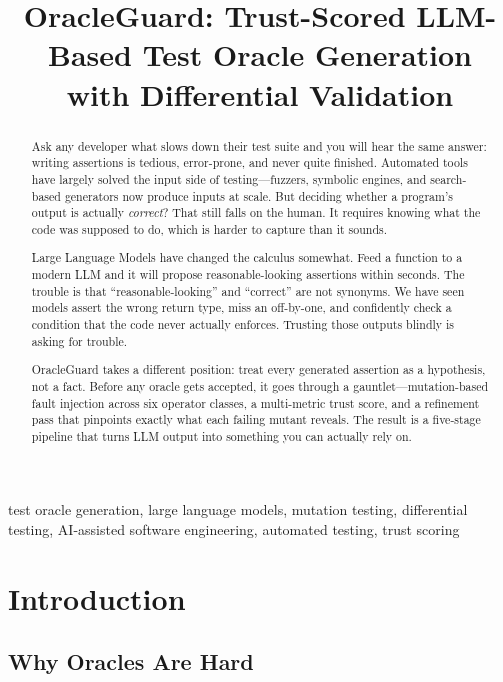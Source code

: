 \documentclass[conference]{IEEEtran}
\title{OracleGuard: Trust-Scored LLM-Based Test Oracle Generation\\with Differential Validation}
\author{
  \IEEEauthorblockN{Anonymous Author(s)}
  \IEEEauthorblockA{Anonymous Institution\\
  Anonymous City, Country\\
  anonymous@email.com}
}
\begin{document}
\maketitle

\begin{abstract}
Ask any developer what slows down their test suite and you will hear the same answer: writing assertions is tedious, error-prone, and never quite finished. Automated tools have largely solved the input side of testing—fuzzers, symbolic engines, and search-based generators now produce inputs at scale. But deciding whether a program's output is actually \emph{correct}? That still falls on the human. It requires knowing what the code was supposed to do, which is harder to capture than it sounds.

Large Language Models have changed the calculus somewhat. Feed a function to a modern LLM and it will propose reasonable-looking assertions within seconds. The trouble is that ``reasonable-looking'' and ``correct'' are not synonyms. We have seen models assert the wrong return type, miss an off-by-one, and confidently check a condition that the code never actually enforces. Trusting those outputs blindly is asking for trouble.

OracleGuard takes a different position: treat every generated assertion as a hypothesis, not a fact. Before any oracle gets accepted, it goes through a gauntlet—mutation-based fault injection across six operator classes, a multi-metric trust score, and a refinement pass that pinpoints exactly what each failing mutant reveals. The result is a five-stage pipeline that turns LLM output into something you can actually rely on.
\end{abstract}

\begin{IEEEkeywords}
test oracle generation, large language models, mutation testing, differential testing, AI-assisted software engineering, automated testing, trust scoring
\end{IEEEkeywords}

\section{Introduction}

\subsection{Why Oracles Are Hard}
\end{document}
